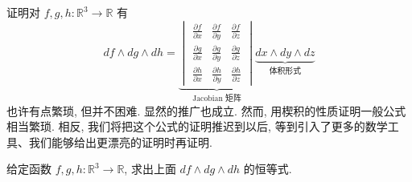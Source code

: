 证明对 $f,g,h:\mathbb{R}^3\to\mathbb{R}$ 有
\[
df\wedge dg\wedge dh
=\underbrace{\begin{vmatrix}\frac{\partial f}{\partial x}&\frac{\partial f}{\partial y}&\frac{\partial f}{\partial z}\\[4pt]\frac{\partial g}{\partial x}&\frac{\partial g}{\partial y}&\frac{\partial g}{\partial z}\\[4pt]\frac{\partial h}{\partial x}&\frac{\partial h}{\partial y}&\frac{\partial h}{\partial z}\end{vmatrix}}_{\text{Jacobian 矩阵}}
\underbrace{dx\wedge dy\wedge dz}_{\text{体积形式}}
\]
也许有点繁琐, 但并不困难. 显然的推广也成立. 然而, 用楔积的性质证明一般公式相当繁琐. 相反, 我们将把这个公式的证明推迟到以后, 等到引入了更多的数学工具、我们能够给出更漂亮的证明时再证明.

\begin{question}\label{q:4-11}
给定函数 $f,g,h:\mathbb{R}^3\to\mathbb{R}$, 求出上面 $df\wedge dg\wedge dh$ 的恒等式.
\end{question}

